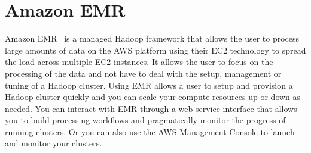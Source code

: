 \section{Amazon EMR}
Amazon EMR~\cite{hid-sp18-521-AmazonEMR} is a managed Hadoop framework 
that allows the user to process large amounts of data on the AWS platform using
their EC2 technology to spread the load across multiple EC2 instances. It allows
the user to focus on the processing of the data and not have to deal with the 
setup, management or tuning of a Hadoop cluster. Using EMR allows a user to setup
and provision a Hadoop cluster quickly and you can scale your compute resources up
or down as needed. You can interact with EMR through a web service interface that
allows you to build processing workflows and pragmatically monitor the progress of
running clusters. Or you can also use the AWS Management Console to launch and 
monitor your clusters.

